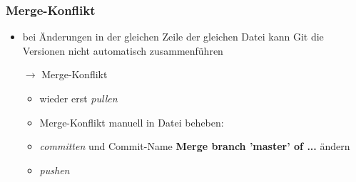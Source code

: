 \documentclass[accentcolor=tud8b,colorbacktitle,inverttitle,landscape,german,presentation,t]{tudbeamer}
\begin{document}
			\begin{frame}
				\frametitle{Merge-Konflikt}
					\begin{itemize}
						\item bei Änderungen in der gleichen Zeile der gleichen Datei kann Git die Versionen nicht automatisch zusammenführen
						\item[$\rightarrow$] Merge-Konflikt
						\begin{itemize}
							\item wieder erst \textit{pullen}
							\item Merge-Konflikt manuell in Datei beheben:\\
							
							\item \textit{committen} und Commit-Name \textbf{Merge branch 'master' of  ...} ändern
							\item \textit{pushen}
						\end{itemize}
					\end{itemize}
			\end{frame}
			
\end{document}
